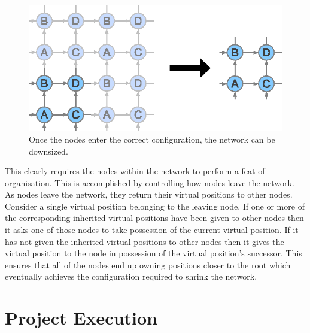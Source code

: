 \documentclass[ %
                    author={Luke Murray},
                supervisor={Dr. Simon Hollis},
                     title={Shadow Peer-to-Peer Networks},
                  subtitle={},
                    degree={MEng},
                      year={2013} ]{thesis}
\begin{document}
\begin{figure}[h]
    \centering
    \includegraphics{diagrams/network_contraction.eps}
    \caption{Once the nodes enter the correct configuration, the network can be downsized.}
    \label{contraction}
\end{figure}

This clearly requires the nodes within the network to perform a feat of organisation. This is accomplished by controlling how nodes leave the network. As nodes leave the network, they return their virtual positions to other nodes. Consider a single virtual position belonging to the leaving node. If one or more of the corresponding inherited virtual positions have been given to other nodes then it asks one of those nodes to take possession of the current virtual position. If it has not given the inherited virtual positions to other nodes then it gives the virtual position to the node in possession of the virtual position's successor. This ensures that all of the nodes end up owning positions closer to the root which eventually achieves the configuration required to shrink the network.


\chapter{Project Execution}
\label{chap:execution}
\end{document}
